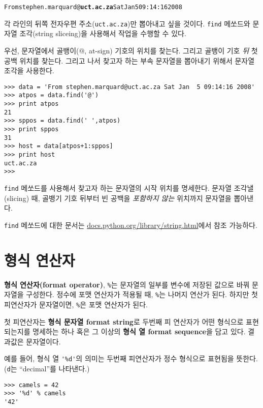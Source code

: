 \beforeverb
\begin{alltt}
From stephen.marquard@{\bf uct.ac.za} Sat Jan  5 09:14:16 2008
\end{alltt}
\afterverb

각 라인의 뒤쪽 전자우편 주소({\tt uct.ac.za})만 뽑아내고 싶을 것이다.
{\tt find} 메쏘드와 문자열 조각(string sliceing)을 사용해서 작업을 수행할 수 있다.

우선, 문자열에서 골뱅이(@, at-sign) 기호의 위치를 찾는다. 그리고 
골뱅이 기호 \emph{뒤} 첫 공백 위치를 찾는다. 그리고 나서 찾고자 하는 부속 문자열을 뽑아내기 위해서 문자열 조각을 사용한다.

\beforeverb
\begin{verbatim}
>>> data = 'From stephen.marquard@uct.ac.za Sat Jan  5 09:14:16 2008'
>>> atpos = data.find('@')
>>> print atpos
21
>>> sppos = data.find(' ',atpos)
>>> print sppos
31
>>> host = data[atpos+1:sppos]
>>> print host
uct.ac.za
>>> 
\end{verbatim}
\afterverb
%

{\tt find} 메쏘드를 사용해서 찾고자 하는 문자열의 시작 위치를 명세한다. 
문자열 조각낼(slicing) 때, 골뱅기 기호 뒤부터 빈 공백을 \emph{포함하지 않는} 위치까지 문자열을 뽑아낸다.  

{\tt find} 메쏘드에 대한 문서는 \url{docs.python.org/library/string.html}에서 참조 가능하다.

\section{형식 연산자}


{\bf 형식 연산자(format operator)}, {\tt \%}는 문자열의 일부를 변수에 저장된 값으로 바꿔 문자열을 구성한다.
정수에 포맷 연산자가 적용될 때, {\tt \%}는 나머지 연산가 된다. 하지만 첫 피연산자가 문자열이면,  {\tt \%}은 포맷 연산자가 된다.


첫 피연산자는 {\bf 형식 문자열 format string}로 두번째 피 연산자가 어떤 형식으로 표현되는지를 명세하는 하나 혹은 그 이상의 
{\bf 형식 열 format sequence}을 담고 있다. 결과값은 문자열이다.


예를 들어, 형식 열 \verb"'%d'"의 의미는 두번째 피연산자가 정수 형식으로 표현됨을 뜻한다. ({\tt d}는 ``decimal''를 나타낸다.)

\beforeverb
\begin{verbatim}
>>> camels = 42
>>> '%d' % camels
'42'
\end{verbatim}
\afterverb
%

